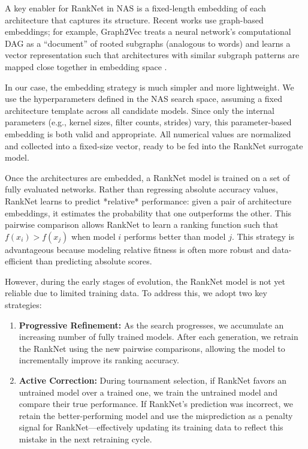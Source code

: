 A key enabler for RankNet in NAS is a fixed-length embedding of each architecture that captures its structure. Recent works use graph-based embeddings; for example, Graph2Vec treats a neural network’s computational DAG as a “document” of rooted subgraphs (analogous to words) and learns a vector representation such that architectures with similar subgraph patterns are mapped close together in embedding space \cite{RankNet}.

In our case, the embedding strategy is much simpler and more lightweight. We use the hyperparameters defined in the NAS search space, assuming a fixed architecture template across all candidate models. Since only the internal parameters (e.g., kernel sizes, filter counts, strides) vary, this parameter-based embedding is both valid and appropriate. All numerical values are normalized and collected into a fixed-size vector, ready to be fed into the RankNet surrogate model.

Once the architectures are embedded, a RankNet model is trained on a set of fully evaluated networks. Rather than regressing absolute accuracy values, RankNet learns to predict *relative* performance: given a pair of architecture embeddings, it estimates the probability that one outperforms the other. This pairwise comparison allows RankNet to learn a ranking function such that $f(x_i) > f(x_j)$ when model $i$ performs better than model $j$. This strategy is advantageous because modeling relative fitness is often more robust and data-efficient than predicting absolute scores.

However, during the early stages of evolution, the RankNet model is not yet reliable due to limited training data. To address this, we adopt two key strategies:

\begin{enumerate}
    \item \textbf{Progressive Refinement:} As the search progresses, we accumulate an increasing number of fully trained models. After each generation, we retrain the RankNet using the new pairwise comparisons, allowing the model to incrementally improve its ranking accuracy.
    
    \item \textbf{Active Correction:} During tournament selection, if RankNet favors an untrained model over a trained one, we train the untrained model and compare their true performance. If RankNet’s prediction was incorrect, we retain the better-performing model and use the misprediction as a penalty signal for RankNet—effectively updating its training data to reflect this mistake in the next retraining cycle.
\end{enumerate}

